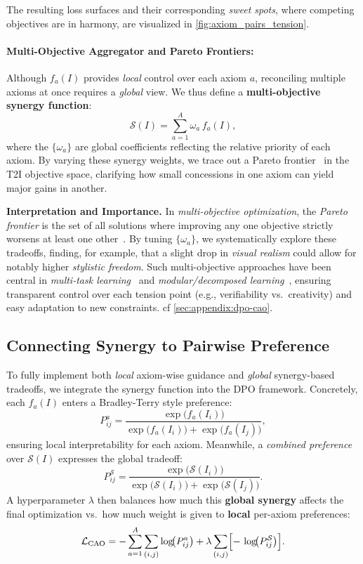 The resulting loss surfaces and their corresponding \emph{sweet spots}, where competing objectives are in harmony, are visualized in \cref{fig:axiom_pairs_tension}.


\paragraph{Multi-Objective Aggregator and Pareto Frontiers:} Although \(f_a(I)\) provides \emph{local} control over each axiom \(a\), reconciling multiple axioms at once requires a \emph{global} view. We thus define a \textbf{multi-objective synergy function}:
\[
\mathcal{S}(I)
=
\sum_{a=1}^A
\omega_a \, f_a(I),
\]
where the \(\{\omega_a\}\) are global coefficients reflecting the relative priority of each axiom. By varying these synergy weights, we trace out a Pareto frontier~\cite{miettinen1999nonlinear, yang2021towards, lin2023pareto} in the T2I objective space, clarifying how small concessions in one axiom can yield major gains in another.




\smallskip
\noindent
\textbf{Interpretation and Importance.}\quad
In \emph{multi-objective optimization}, the \emph{Pareto frontier} is the set of all solutions where improving any one objective strictly worsens at least one other~\cite{deb2001multiobjective, zhou2022pareto}. By tuning \(\{\omega_a\}\), we systematically explore these tradeoffs, finding, for example, that a slight drop in \emph{visual realism} could allow for notably higher \emph{stylistic freedom}. Such multi-objective approaches have been central in \emph{multi-task learning}~\cite{ma2020quadratic, navon2022multi, yu2020gradient} and \emph{modular/decomposed learning}~\cite{liebenwein2021provable, lin2022pareto}, ensuring transparent control over each tension point (e.g., verifiability vs.\ creativity) and easy adaptation to new constraints. cf  \cref{sec:appendix:dpo-cao}. 


\subsection{Connecting Synergy to Pairwise Preference}

To fully implement both \emph{local} axiom-wise guidance and \emph{global} synergy-based tradeoffs, we integrate the synergy function into the DPO framework. Concretely, each \(f_a(I)\) enters a Bradley-Terry style preference:
\[
P_{ij}^a
=
\frac{
\exp\!\bigl(f_a(I_i)\bigr)
}{
\exp\!\bigl(f_a(I_i)\bigr) + \exp\!\bigl(f_a(I_j)\bigr)
},
\]
ensuring local interpretability for each axiom. Meanwhile, a \emph{combined preference} over \(\mathcal{S}(I)\) expresses the global tradeoff:
\[
P_{ij}^{\mathcal{S}}
=
\frac{\exp\!\bigl(\mathcal{S}(I_i)\bigr)}
     {\exp\!\bigl(\mathcal{S}(I_i)\bigr) + \exp\!\bigl(\mathcal{S}(I_j)\bigr)}.
\]
A hyperparameter \(\lambda\) then balances how much this \textbf{global synergy} affects the final optimization vs.\ how much weight is given to \textbf{local} per-axiom preferences:
\[
\mathcal{L}_{\text{CAO}}
=
- \sum_{a=1}^{A}
\sum_{(i,j)}
\log\!\bigl(P_{ij}^a\bigr)
+
\lambda
\sum_{(i,j)}
\Bigl[
-\,\log\!\bigl(P_{ij}^{\mathcal{S}}\bigr)
\Bigr].
\]

